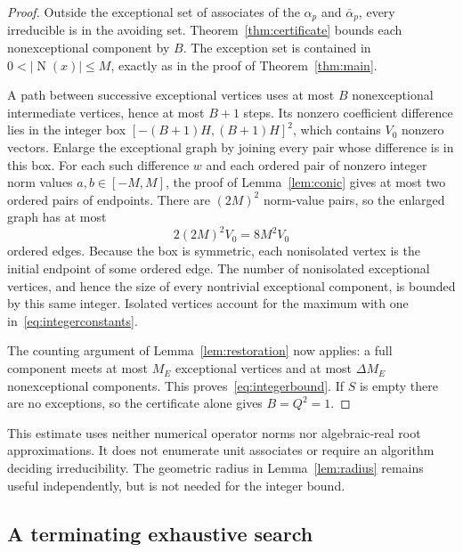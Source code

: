 \documentclass[11pt]{article}
\numberwithin{equation}{section}
\theoremstyle{definition}\newtheorem{definition}[theorem]{Definition}
\theoremstyle{remark}\newtheorem{remark}[theorem]{Remark}
\newcommand{\abs}[1]{\lvert #1\rvert}
\newcommand{\N}{\operatorname{N}}
\begin{document}
\begin{proof}
Outside the exceptional set of associates of the $\alpha_p$ and $\bar\alpha_p$, every irreducible is in the avoiding set. Theorem~\ref{thm:certificate} bounds each nonexceptional component by $B$. The exception set is contained in $0<\abs{\N(x)}\le M$, exactly as in the proof of Theorem~\ref{thm:main}.

A path between successive exceptional vertices uses at most $B$ nonexceptional intermediate vertices, hence at most $B+1$ steps. Its nonzero coefficient difference lies in the integer box
$[-(B+1)H,(B+1)H]^2$, which contains $V_0$ nonzero vectors. Enlarge the exceptional graph by joining every pair whose difference is in this box. For each such difference $w$ and each ordered pair of nonzero integer norm values $a,b\in[-M,M]$, the proof of Lemma~\ref{lem:conic} gives at most two ordered pairs of endpoints. There are $(2M)^2$ norm-value pairs, so the enlarged graph has at most
\[
 2(2M)^2V_0=8M^2V_0
\]
ordered edges. Because the box is symmetric, each nonisolated vertex is the initial endpoint of some ordered edge. The number of nonisolated exceptional vertices, and hence the size of every nontrivial exceptional component, is bounded by this same integer. Isolated vertices account for the maximum with one in~\eqref{eq:integerconstants}.

The counting argument of Lemma~\ref{lem:restoration} now applies: a full component meets at most $M_E$ exceptional vertices and at most $\Delta M_E$ nonexceptional components. This proves~\eqref{eq:integerbound}. If $S$ is empty there are no exceptions, so the certificate alone gives $B=Q^2=1$.
\end{proof}

This estimate uses neither numerical operator norms nor algebraic-real root approximations. It does not enumerate unit associates or require an algorithm deciding irreducibility. The geometric radius in Lemma~\ref{lem:radius} remains useful independently, but is not needed for the integer bound.

\subsection{A terminating exhaustive search}
\end{document}
